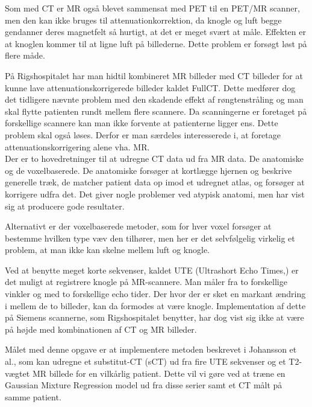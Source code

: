 Som med CT er MR også blevet sammensat med PET til en PET/MR scanner, men
den kan ikke bruges til attenuationkorrektion, da knogle og luft begge 
gendanner deres magnetfelt så hurtigt, at det er meget svært at måle.
Effekten er at knoglen kommer til at ligne luft på billederne. Dette
problem er forsøgt løst på flere måde.

På Rigshospitalet har man hidtil kombineret MR billeder med CT
billeder for at kunne lave attenuationskorrigerede billeder kaldet FullCT.
Dette medfører dog det tidligere nævnte problem med den skadende
effekt af røngtenstråling og man skal flytte patienten rundt mellem
flere scannere. Da scanningerne er foretaget på forskellige scannere
kan man ikke forvente at patienterne ligger ens. Dette problem skal
også løses. Derfor er man særdeles interesserede i, at foretage
attenuationskorrigering alene vha. MR. \\

Der er to hovedretninger til at udregne CT data ud fra MR data. De
anatomiske og de voxelbaserede. De anatomiske forsøger at kortlægge
hjernen og beskrive generelle træk, de matcher patient data op imod et
udregnet atlas, og forsøger at korrigere udfra det. Det giver nogle
problemer ved atypisk anatomi, men har vist sig at producere gode
resultater.

Alternativt er der voxelbaserede metoder, som for hver voxel forsøger
at bestemme hvilken type væv den tilhører, men her er det selvfølgelig
virkelig et problem, at man ikke kan skelne mellem luft og knogle.

Ved at benytte meget korte sekvenser, kaldet UTE (Ultrashort Echo Times,)
er det muligt at registrere knogle på MR-scannere. Man måler fra to
forskellige vinkler og med to forskellige echo tider. Der hvor der er
sket en markant ændring i mellem de to billeder, kan da formodes at
være knogle. Implementation af dette på Siemens scannerne, som
Rigshospitalet benytter, har dog vist sig ikke at være på højde med
kombinationen af CT og MR billeder.

Målet med denne opgave er at implementere metoden beskrevet i
Johansson et al., som kan udregne et substitut-CT (sCT) ud fra fire
UTE sekvenser og et T2-vægtet MR billede for en vilkårlig patient. Dette
vil vi gøre ved at træne en Gaussian Mixture Regression model ud fra
disse serier samt et CT målt på samme patient.
